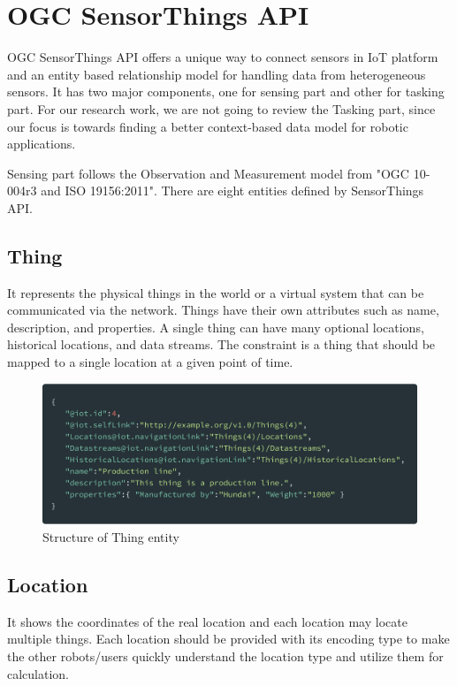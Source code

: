 	\section{OGC SensorThings API}
	OGC SensorThings API offers a unique way to connect sensors in IoT platform and an entity based relationship model for handling data from heterogeneous sensors. It has two major components, one for sensing part and other for tasking part. For our research work, we are not going to review the Tasking part, since our focus is towards finding a better context-based data model for robotic applications.
	
	Sensing part follows the Observation and Measurement model from "OGC 10-004r3 and ISO 19156:2011". There are eight entities defined by SensorThings API.
	
	\subsection{Thing}
	It represents the physical things in the world or a virtual system that can be communicated via the network. Things have their own attributes such as name, description, and properties. A single thing can have many optional locations, historical locations, and data streams. The constraint is a thing that should be mapped to a single location at a given point of time.
	
	\begin{figure}[!htbp] 
		\begin{center}
			\includegraphics[scale=0.1]{./images/png/ogc/thing}	
			\caption{Structure of Thing entity}	
			\label{fig:thing}	
		\end{center}
	\end{figure}

	\subsection{Location}
	It shows the coordinates of the real location and each location may locate multiple things. Each location should be provided with its encoding type to make the other robots/users quickly understand the location type and utilize them for calculation.
	
